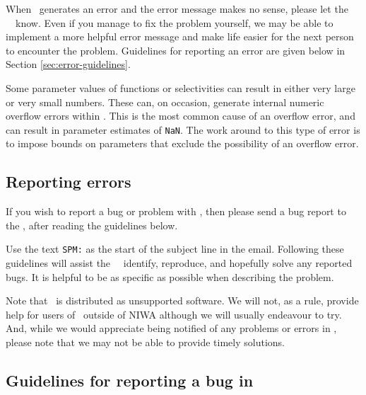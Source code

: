 When \SPM\ generates an error and the error message makes no sense, please let the \SPM\ \authors\ know. Even if you manage to fix the problem yourself, we may be able to implement a more helpful error message and make life easier for the next person to encounter the problem. Guidelines for reporting an error are given below in Section \ref{sec:error-guidelines}.

Some parameter values of functions or selectivities can result in either very large or very small numbers. These can, on occasion, generate internal numeric overflow errors within \SPM. This is the most common cause of an overflow error, and can result in parameter estimates of \texttt{NaN}. The work around to this type of error is to impose bounds on parameters that exclude the possibility of an overflow error.

\subsection{Reporting errors\label{sec:reporting-errors}}

If you wish to report a bug or problem with \SPM, then please send a bug report to the \authors, after reading the guidelines below. 

Use the text \texttt{SPM:} as the start of the subject line in the email. Following these guidelines will assist the \SPM\ \authors\ identify, reproduce, and hopefully solve any reported bugs. It is helpful to be as specific as possible when describing the problem.

Note that \SPM\ is distributed as unsupported software. We will not, as a rule, provide help for users of \SPM\ outside of NIWA \textemdash although we will usually endeavour to try. And, while we would appreciate being notified of any problems or errors in \SPM, please note that we may not be able to provide timely solutions.

\subsection{Guidelines for reporting a bug in \SPM\label{sec:error-guidelines}}

